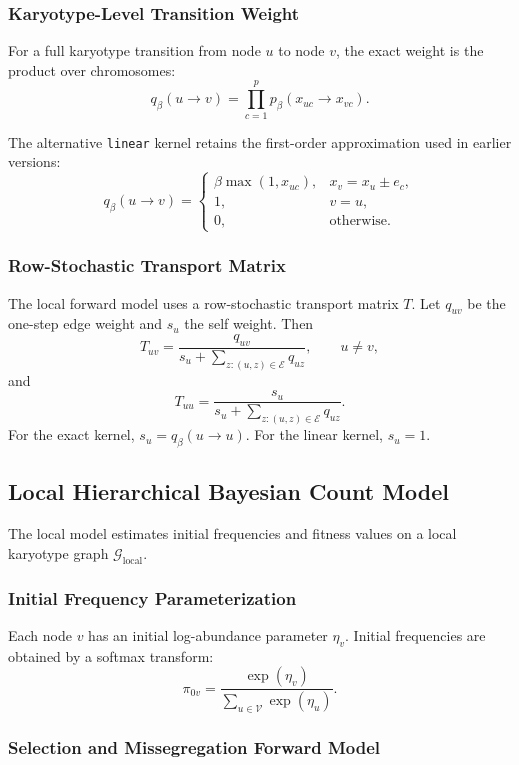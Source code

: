 \documentclass[11pt]{article}
\begin{document}
\subsubsection{Karyotype-Level Transition Weight}

For a full karyotype transition from node $u$ to node $v$, the exact weight is
the product over chromosomes:
\[
  q_{\beta}(u \to v)
  =
  \prod_{c=1}^{p}
  p_{\beta}(x_{uc}\to x_{vc}).
\]

The alternative \texttt{linear} kernel retains the first-order
approximation used in earlier versions:
\[
  q_{\beta}(u \to v)
  =
  \begin{cases}
  \beta\max(1,x_{uc}), & x_v=x_u\pm e_c,\\
  1, & v=u,\\
  0, & \text{otherwise}.
  \end{cases}
\]

\subsubsection{Row-Stochastic Transport Matrix}

The local forward model uses a row-stochastic transport matrix $T$. Let
$q_{uv}$ be the one-step edge weight and $s_u$ the self weight. Then
\[
  T_{uv}
  =
  \frac{q_{uv}}{s_u+\sum_{z:(u,z)\in\mathcal{E}}q_{uz}},
  \qquad u\ne v,
\]
and
\[
  T_{uu}
  =
  \frac{s_u}{s_u+\sum_{z:(u,z)\in\mathcal{E}}q_{uz}}.
\]
For the exact kernel, $s_u=q_\beta(u\to u)$. For the linear kernel, $s_u=1$.

\subsection{Local Hierarchical Bayesian Count Model}
\label{sec:s-local}

The local model estimates initial frequencies and fitness values on a local
karyotype graph $\mathcal{G}_{\mathrm{local}}$.

\subsubsection{Initial Frequency Parameterization}

Each node $v$ has an initial log-abundance parameter $\eta_v$. Initial
frequencies are obtained by a softmax transform:
\[
  \pi_{0v}
  =
  \frac{\exp(\eta_v)}
       {\sum_{u\in\mathcal{V}}\exp(\eta_u)}.
\]

\subsubsection{Selection and Missegregation Forward Model}
\end{document}
